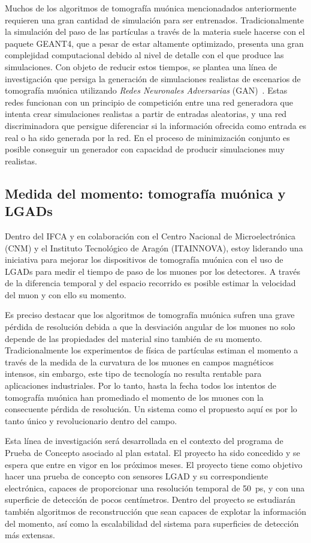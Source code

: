 Muchos de los algoritmos de tomografía muónica mencionadados anteriormente requieren una gran cantidad de simulación para ser entrenados. Tradicionalmente la simulación del paso de las partículas a través de la materia suele hacerse con el paquete GEANT4, que a pesar de estar altamente optimizado, presenta una gran complejidad computacional debido al nivel de detalle con el que produce las simulaciones. Con objeto de reducir estos tiempos, se plantea una línea de investigación que persiga la generación de simulaciones realistas de escenarios de tomografía muónica utilizando \emph{Redes Neuronales Adversarias} (GAN)~\cite{gan}. Estas redes funcionan con un principio de competición entre una red generadora que intenta crear simulaciones realistas a partir de entradas aleatorias, y una red discriminadora que persigue diferenciar si la información ofrecida como entrada es real o ha sido generada por la red. En el proceso de minimización conjunto es posible conseguir un generador con capacidad de producir simulaciones muy realistas.

\subsection{Medida del momento: tomografía muónica y LGADs}

Dentro del IFCA y en colaboración con el Centro Nacional de Microelectrónica (CNM) y el Instituto Tecnológico de Aragón (ITAINNOVA), estoy liderando una iniciativa para mejorar los dispositivos de tomografía muónica con el uso de LGADs para medir el tiempo de paso de los muones por los detectores. A través de la diferencia temporal y del espacio recorrido es posible estimar la velocidad del muon y con ello su momento. 

Es preciso destacar que los algoritmos de tomografía muónica sufren una grave pérdida de resolución debida a que la desviación angular de los muones no solo depende de las propiedades del material sino también de su momento. Tradicionalmente los experimentos de física de partículas estiman el momento a través de la medida de la curvatura de los muones en campos magnéticos intensos, sin embargo, este tipo de tecnología no resulta rentable para aplicaciones industriales. Por lo tanto, hasta la fecha todos los intentos de tomografía muónica han promediado el momento de los muones con la consecuente pérdida de resolución. Un sistema como el propuesto aquí es por lo tanto único y revolucionario dentro del campo. 

Esta línea de investigación será desarrollada en el contexto del programa de Prueba de Concepto asociado al plan estatal. El proyecto ha sido concedido y se espera que entre en vigor en los próximos meses. El proyecto tiene como objetivo hacer una prueba de concepto con sensores LGAD y su correspondiente electrónica, capaces de proporcionar una resolución temporal de 50~ps, y con una superficie de detección de pocos centímetros. Dentro del proyecto se estudiarán también algoritmos de reconstrucción que sean capaces de explotar la información del momento, así como la escalabilidad del sistema para superficies de detección más extensas.


